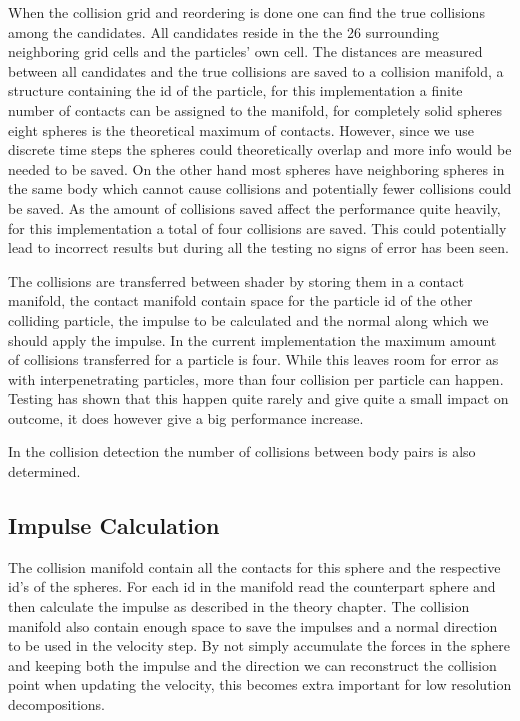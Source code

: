 When the collision grid and reordering is done one can find the true collisions
among the candidates. All candidates reside in the the 26 surrounding neighboring
grid cells and the particles' own cell. The distances are measured between all
candidates and the true collisions are saved to a collision manifold, a structure
containing the id of the particle, for this implementation a finite number of
contacts can be assigned to the manifold, for completely solid spheres eight spheres
is the theoretical maximum of contacts. However, since we use discrete time steps
the spheres could theoretically overlap and more info would be needed to be saved.
On the other hand most spheres have neighboring spheres in the same body which cannot
cause collisions and potentially fewer collisions could be saved. As the amount of
collisions saved affect the performance quite heavily, for this implementation a total
of four collisions are saved. This could potentially lead to incorrect results but
during all the testing no signs of error has been seen.

The collisions are transferred between shader by storing them in a contact manifold,
the contact manifold contain space for the particle id of the other colliding particle,
the impulse to be calculated and the normal along which we should apply the impulse.
In the current implementation the maximum amount of collisions transferred for a
particle is four. While this leaves room for error as with interpenetrating particles,
more than four collision per particle can happen. Testing has shown that this happen
quite rarely and give quite a small impact on outcome, it does however give a big
performance increase.

In the collision detection the number of collisions between body pairs is also determined.


\subsection{Impulse Calculation}
The collision manifold contain all the contacts for this sphere and the respective
id's of the spheres. For each id in the manifold read the counterpart sphere and
then calculate the impulse as described in the theory chapter. The collision manifold
also contain enough space to save the impulses and a normal direction to be used
in the velocity step. By not simply accumulate the forces in the sphere and keeping
both the impulse and the direction we can reconstruct the collision point when updating
the velocity, this becomes extra important for low resolution decompositions.

